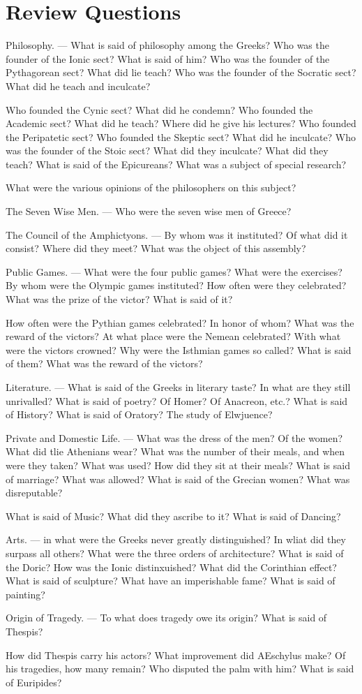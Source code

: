 \documentclass[openany,a4paper]{memoir}
\begin{document}
\section{Review Questions}

Philosophy. — What is said of philosophy among the 
Greeks? Who was the founder of the Ionic sect? What is said of him? 
Who was the founder of the Pythagorean sect? What did lie teach? 
Who was the founder of the Socratic sect? What did he teach and inculcate? 


Who founded the Cynic sect? What did he condemn? Who 
founded the Academic sect? What did he teach? Where did he 
give his lectures? Who founded the Peripatetic sect? Who founded 
the Skeptic sect? What did he inculcate? Who was the founder of 
the Stoic sect? What did they inculcate? What did they teach? 
What is said of the Epicureans? What was a subject of special research? 

What were the various opinions of the philosophers on this subject? 

The Seven Wise Men. — Who were the seven wise men of Greece? 

The Council of the Amphictyons. — By whom was it instituted? 
Of what did it consist? Where did they meet? What was the object 
of this assembly? 

Public Games. — What were the four public games? What were 
the exercises? By whom were the Olympic games instituted? How 
often were they celebrated? What was the prize of the victor? What 
is said of it? 

How often were the Pythian games celebrated? In honor of whom? 
What was the reward of the victors? At what place were the Nemean 
celebrated? With what were the victors crowned? Why were the 
Isthmian games so called? What is said of them? What was the 
reward of the victors? 

Literature. — What is said of the Greeks in literary taste? In 
what are they still unrivalled? What is said of poetry? Of Homer? 
Of Anacreon, etc.? What is said of History? What is said of Oratory? The study of Elwjuence? 

Private and Domestic Life. — What was the dress of the men? 
Of the women? What did tlie Athenians wear? What was the 
number of their meals, and when were they taken? What was used? 
How did they sit at their meals? What is said of marriage? What 
was allowed? What is said of the Grecian women? What was disreputable? 

What is said of Music? What did they ascribe to it? What is said 
of Dancing? 

Arts. — in what were the Greeks never greatly distinguished? In 
wliat did they surpass all others? What were the three orders of architecture? What is said of the Doric? How was the Ionic distinxuished? 
What did the Corinthian effect? What is said of sculpture? What have 
an imperishable fame? What is said of painting? 

Origin of Tragedy. — To what does tragedy owe its origin? What 
is said of Thespis? 

How did Thespis carry his actors? What improvement did AEschylus 
make? Of his tragedies, how many remain? Who disputed the palm 
with him? What is said of Euripides? 
\end{document}
